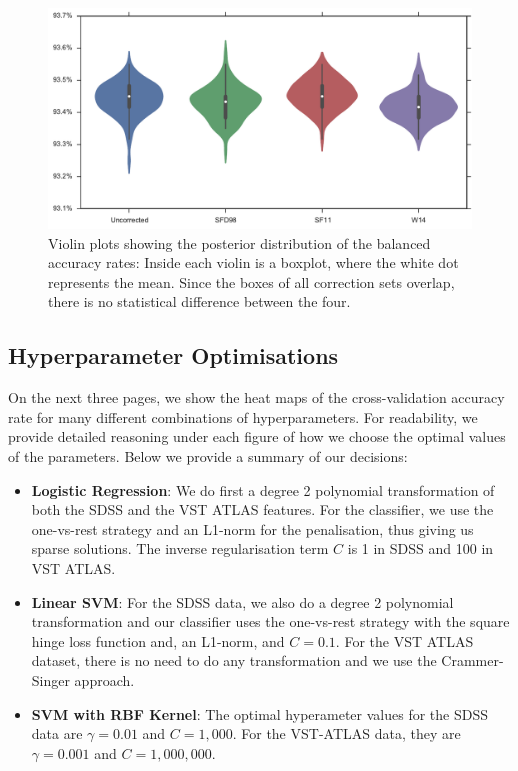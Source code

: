 \begin{figure}[tbp]
	\centering
	\includegraphics[width=\textwidth]{figures/4_expt1/violin_reddening_correction}
	\caption[Accuracy rates with four reddening correction sets]{Violin plots
		showing the posterior distribution of the balanced accuracy rates: Inside each
		violin is a boxplot, where the white dot represents the mean. Since the boxes of
		all correction sets overlap, there is no statistical difference between the four.}
	\label{fig:reddeningviolin}
\end{figure}

\subsection{Hyperparameter Optimisations}
\label{sec:hyper}

On the next three pages, we show the heat maps of the cross-validation accuracy rate
for many different combinations of hyperparameters. For readability, we provide detailed
reasoning under each figure of how we choose the optimal values of the parameters.
Below we provide a summary of our decisions:
\begin{itemize}
	\item \textbf{Logistic Regression}: We do first a degree 2 polynomial transformation of both
	the SDSS and the VST ATLAS features. For the classifier, we use the one-vs-rest
	strategy and an L1-norm for the penalisation, thus giving us sparse solutions. The inverse
	regularisation term $C$ is 1 in SDSS and 100 in VST ATLAS.
	\item \textbf{Linear SVM}: For the SDSS data, we also do a degree 2 polynomial transformation
	and our classifier uses the one-vs-rest strategy with the square hinge loss function
	and, an L1-norm, and $C=0.1$. For the VST ATLAS dataset, there is no need to do 
	any transformation and we use the Crammer-Singer approach.
	\item \textbf{SVM with RBF Kernel}: The optimal hyperameter values for the SDSS data are
	$\gamma = 0.01$ and $C = 1,000$. For the VST-ATLAS data, they are $\gamma = 0.001$ and
	$C = 1,000,000$.
\end{itemize}

